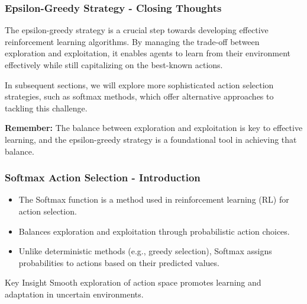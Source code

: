 \documentclass[aspectratio=169]{beamer}
\begin{document}
\begin{frame}[fragile]
    \frametitle{Epsilon-Greedy Strategy - Closing Thoughts}
    The epsilon-greedy strategy is a crucial step towards developing effective reinforcement learning algorithms. By managing the trade-off between exploration and exploitation, it enables agents to learn from their environment effectively while still capitalizing on the best-known actions. 

    In subsequent sections, we will explore more sophisticated action selection strategies, such as softmax methods, which offer alternative approaches to tackling this challenge.

    \textbf{Remember:} The balance between exploration and exploitation is key to effective learning, and the epsilon-greedy strategy is a foundational tool in achieving that balance.
\end{frame}

\begin{frame}[fragile]
    \frametitle{Softmax Action Selection - Introduction}
    \begin{itemize}
        \item The Softmax function is a method used in reinforcement learning (RL) for action selection.
        \item Balances exploration and exploitation through probabilistic action choices.
        \item Unlike deterministic methods (e.g., greedy selection), Softmax assigns probabilities to actions based on their predicted values.
    \end{itemize}
    \begin{block}{Key Insight}
        Smooth exploration of action space promotes learning and adaptation in uncertain environments.
    \end{block}
\end{frame}
\end{document}
